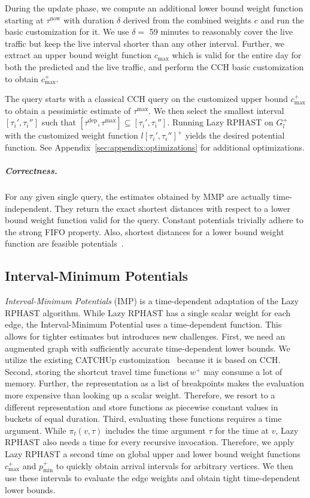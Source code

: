 \documentclass[a4paper,UKenglish,cleveref, autoref, thm-restate]{lipics-v2021}
\newcommand*{\pred}{p}
\newcommand*{\comb}{c}
\newcommand*{\tdep}{\tau^{\operatorname{dep}}}
\newcommand*{\tnow}{\tau^{\operatorname{now}}}
\newcommand*{\tmax}{\tau^{\max}}
\begin{document}
During the update phase, we compute an additional lower bound weight function starting at $\tnow$ with duration $\delta$ derived from the combined weights $\comb$ and run the basic customization for it.
We use $\delta =$ 59 minutes to reasonably cover the live traffic but keep the live interval shorter than any other interval.
Further, we extract an upper bound weight function $\comb_{\max}$ which is valid for the entire day for both the predicted and the live traffic, and perform the CCH basic customization to obtain $\comb^+_{\max}$.

The query starts with a classical CCH query on the customized upper bound $\comb^+_{\max}$ to obtain a pessimistic estimate of $\tmax$.
We then select the smallest interval $[\tau_i', \tau_i'']$ such that $[\tdep,\tmax] \subseteq [\tau_i', \tau_i'']$.
Running Lazy RPHAST on $G^+_l$ with the customized weight function $l[\tau_i', \tau_i'']^+$ yields the desired potential function.
See Appendix~\ref{sec:appendix:optimizations} for additional optimizations.

\subparagraph{Correctness.}
For any given single query, the estimates obtained by MMP are actually time-independent.
They return the exact shortest distances with respect to a lower bound weight function valid for the query.
Constant potentials trivially adhere to the strong FIFO property.
Also, shortest distances for a lower bound weight function are feasible potentials~\cite{strasser_et_al:LIPIcs.SEA.2021.6}.

\subsection{Interval-Minimum Potentials}

\emph{Interval-Minimum Potentials} (IMP) is a time-dependent adaptation of the Lazy RPHAST algorithm.
While Lazy RPHAST has a single scalar weight for each edge, the Interval-Minimum Potential uses a time-dependent function.
This allows for tighter estimates but introduces new challenges.
First, we need an augmented graph with sufficiently accurate time-dependent lower bounds.
We utilize the existing CATCHUp customization~\cite{swz-sfert-21} because it is based on CCH.
Second, storing the shortcut travel time functions $w^+$ may consume a lot of memory.
Further, the representation as a list of breakpoints makes the evaluation more expensive than looking up a scalar weight.
Therefore, we resort to a different representation and store functions as piecewise constant values in buckets of equal duration.
Third, evaluating these functions requires a time argument.
While $\pi_t(v, \tau)$ includes the time argument $\tau$ for the time at $v$, Lazy RPHAST also needs a time for every recursive invocation.
Therefore, we apply Lazy RPHAST a second time on global upper and lower bound weight functions $\comb_{\max}^+$ and $\pred_{\min}^+$ to quickly obtain arrival intervals for arbitrary vertices.
We then use these intervals to evaluate the edge weights and obtain tight time-dependent lower bounds.
\end{document}
